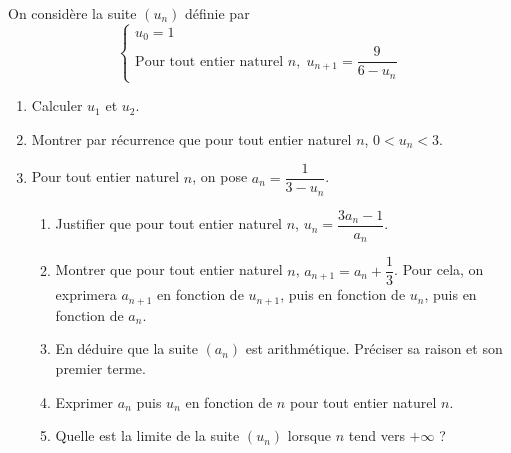 \documentclass[11pt,fleqn]{book} %
\begin{document}
\begin{exercise}[topic=lim03]On considère la suite $(u_n)$ définie par
\[ \left\{ \begin{array}{l}
      u_0 = 1 \\
      \text{Pour tout entier naturel } n,\; u_{n+1}=\dfrac{9}{6-u_n}
\end{array}\right.\]

\begin{enumerate}
    \item Calculer $u_1$ et  $u_2$.
    \item Montrer par récurrence que pour tout entier naturel $n$, $0<u_n<3$.
    \item Pour tout entier naturel $n$, on pose $a_n=\dfrac{1}{3-u_n}$.
    \begin{enumerate}
        \item Justifier que pour tout entier naturel $n$, $u_n=\dfrac{3a_n-1}{a_n}$.
        \item Montrer que pour tout entier naturel $n$, $a_{n+1}=a_n+\dfrac{1}{3}$. Pour cela, on exprimera $a_{n+1}$ en fonction de $u_{n+1}$, puis en fonction de $u_n$, puis en fonction de $a_n$.
        \item En déduire que la suite $(a_n)$ est arithmétique. Préciser sa raison et son premier terme.
        \item Exprimer $a_n$ puis $u_n$ en fonction de $n$ pour tout entier naturel $n$.
        \item Quelle est la limite de la suite $(u_n)$ lorsque $n$ tend vers $+\infty$ ?
    \end{enumerate}
\end{enumerate}\end{exercise}
\end{document}
